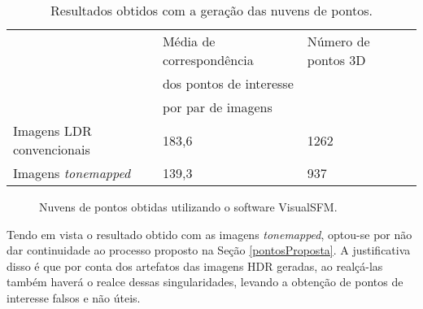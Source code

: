 \begin{table}[H]
  \centering
  \caption{Resultados obtidos com a geração das nuvens de pontos.}
  \label{tabResultados}
  \begin{tabular}{l|l|l}
    \hline
               & Média de correspondência &  Número de pontos 3D \\
               & dos pontos de interesse  \\
               & por par de imagens       \\
    \hline
    Imagens LDR convencionais & 183,6 & 1262 \\
    \hline
    Imagens \textit{tonemapped} & 139,3 & 937 \\  
    \hline
  \end{tabular}
\end{table}

\begin{figure}[H]
  \centering 
  \quad %
  \caption{Nuvens de pontos obtidas utilizando o software VisualSFM.}
  \label{figNuvemPontos}
\end{figure}


Tendo em vista o resultado obtido com as imagens \textit{tonemapped}, optou-se por não dar continuidade ao processo proposto na Seção \ref{pontosProposta}. A justificativa disso é que por conta dos artefatos das imagens HDR geradas, ao realçá-las também haverá o realce dessas singularidades, levando a obtenção de pontos de interesse falsos e não úteis.